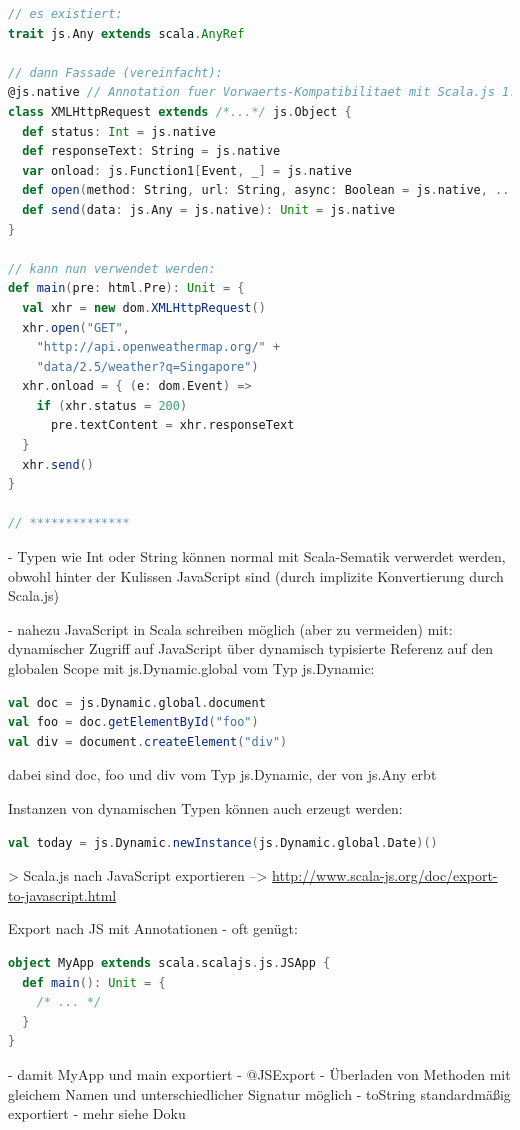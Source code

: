 \documentclass[a4paper, 12pt, listof=totoc, bibliography=totoc]{scrreprt}
\begin{document}
\begin{lstlisting}[language=Scala]
// es existiert:
trait js.Any extends scala.AnyRef

// dann Fassade (vereinfacht):
@js.native // Annotation fuer Vorwaerts-Kompatibilitaet mit Scala.js 1.0.0
class XMLHttpRequest extends /*...*/ js.Object {
  def status: Int = js.native
  def responseText: String = js.native
  var onload: js.Function1[Event, _] = js.native
  def open(method: String, url: String, async: Boolean = js.native, ...): Unit = js.native
  def send(data: js.Any = js.native): Unit = js.native
}

// kann nun verwendet werden:
def main(pre: html.Pre): Unit = {
  val xhr = new dom.XMLHttpRequest()
  xhr.open("GET",
    "http://api.openweathermap.org/" +
    "data/2.5/weather?q=Singapore")
  xhr.onload = { (e: dom.Event) =>
    if (xhr.status = 200)
      pre.textContent = xhr.responseText
  }
  xhr.send()
}

// **************
\end{lstlisting}
- Typen wie Int oder String können normal mit Scala-Sematik verwerdet werden, obwohl hinter der Kulissen JavaScript sind (durch implizite Konvertierung durch Scala.js)



- nahezu JavaScript in Scala schreiben möglich (aber zu vermeiden) mit: dynamischer Zugriff auf JavaScript über dynamisch typisierte Referenz auf den globalen Scope mit js.Dynamic.global vom Typ js.Dynamic:
\begin{lstlisting}[language=Scala]
val doc = js.Dynamic.global.document
val foo = doc.getElementById("foo")
val div = document.createElement("div")
\end{lstlisting}
dabei sind doc, foo und div vom Typ js.Dynamic, der von js.Any erbt

Instanzen von dynamischen Typen können auch erzeugt werden:
\begin{lstlisting}[language=Scala]
val today = js.Dynamic.newInstance(js.Dynamic.global.Date)()
\end{lstlisting}



> Scala.js nach JavaScript exportieren
	-->  \url{http://www.scala-js.org/doc/export-to-javascript.html}

Export nach JS mit Annotationen
- oft genügt:
\begin{lstlisting}[language=Scala]
object MyApp extends scala.scalajs.js.JSApp {
  def main(): Unit = {
  	/* ... */
  }
}
\end{lstlisting}
	- damit MyApp und main exportiert
- @JSExport
	- Überladen von Methoden mit gleichem Namen und unterschiedlicher Signatur möglich
- toString standardmäßig exportiert
- mehr siehe Doku
\end{document}
